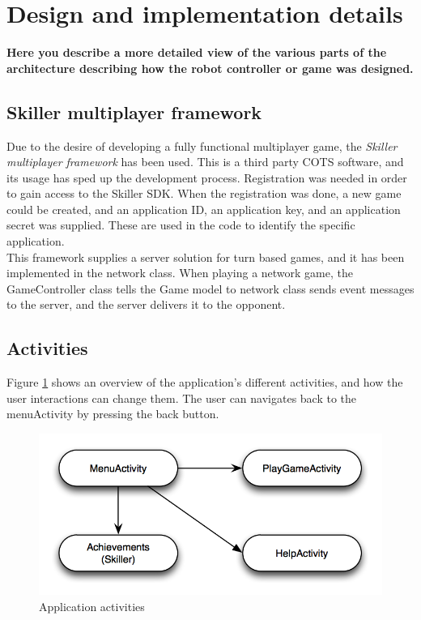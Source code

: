 \section{Design and implementation details}

{\bf Here you describe a more detailed view of the various parts of the architecture describing how the robot controller or game was designed.}


\subsection{Skiller multiplayer framework}
Due to the desire of developing a fully functional multiplayer game, the \emph{Skiller multiplayer framework} \cite{skiller} has been used. This is a third party COTS software, and its usage has sped up the development process. Registration was needed in order to gain access to the Skiller SDK. When the registration was done, a new game could be created, and an application ID, an application key, and an application secret was supplied. These are used in the code to identify the specific application. \\

This framework supplies a server solution for turn based games, and it has been implemented in the network class. When playing a network game, the GameController class tells the Game model to  network class sends event messages to the server, and the server delivers it to the opponent.

\subsection{Activities}
Figure \ref{fig:activities} shows an overview of the application's different activities, and how the user interactions can change them. The user can navigates back to the menuActivity by pressing the back button.\\

\begin{figure}[H]
\includegraphics[width=1\textwidth]{Images/activities}
\caption{Application activities}
\label{fig:activities}
\end{figure}

